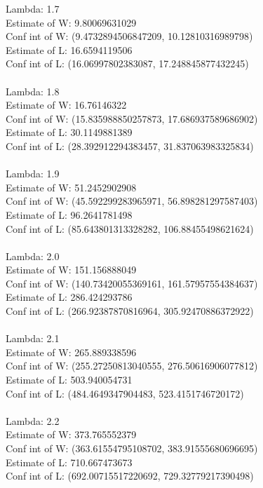 \documentclass{article}
\begin{document}
Lambda:  1.7\\
	Estimate of W: 9.80069631029\\
	Conf int of W: (9.4732894506847209, 10.12810316989798)\\
	Estimate of L: 16.6594119506\\
	Conf int of L: (16.06997802383087, 17.248845877432245)\\
\\
Lambda:  1.8\\
	Estimate of W: 16.76146322\\
	Conf int of W: (15.835988850257873, 17.686937589686902)\\
	Estimate of L: 30.1149881389\\
	Conf int of L: (28.392912294383457, 31.837063983325834)\\
\\
Lambda:  1.9\\
	Estimate of W: 51.2452902908\\
	Conf int of W: (45.592299283965971, 56.898281297587403)\\
	Estimate of L: 96.2641781498\\
	Conf int of L: (85.643801313328282, 106.88455498621624)\\
\\
Lambda:  2.0\\
	Estimate of W: 151.156888049\\
	Conf int of W: (140.73420055369161, 161.57957554384637)\\
	Estimate of L: 286.424293786\\
	Conf int of L: (266.92387870816964, 305.92470886372922)\\
\\
Lambda:  2.1\\
	Estimate of W: 265.889338596\\
	Conf int of W: (255.27250813040555, 276.50616906077812)\\
	Estimate of L: 503.940054731\\
	Conf int of L: (484.4649347904483, 523.4151746720172)\\
\\
Lambda:  2.2\\
	Estimate of W: 373.765552379\\
	Conf int of W: (363.61554795108702, 383.91555680696695)\\
	Estimate of L: 710.667473673\\
	Conf int of L: (692.00715517220692, 729.32779217390498)\\
\end{document}
